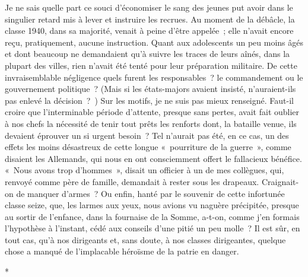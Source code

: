 \documentclass[french,twoside]{book} %
\begin{document}
Je ne sais quelle part ce souci d’économiser le sang des jeunes put avoir dans le singulier retard mis à lever et instruire les recrues. Au moment de la débâcle, la classe 1940, dans sa majorité, venait à peine d’être appelée ; elle n’avait encore reçu, pratiquement, aucune instruction. Quant aux adolescents un peu moins âgés et dont beaucoup ne demandaient qu’à suivre les traces de leurs aînés, dans la plupart des villes, rien n’avait été tenté pour leur préparation militaire. De cette invraisemblable négligence quels furent les responsables ? le   commandement ou le gouvernement politique ? (Mais si les états-majors avaient insisté, n’auraient-ils pas enlevé la décision ? ) Sur les motifs, je ne suis pas mieux renseigné. Faut-il croire que l’interminable période d’attente, presque sans pertes, avait fait oublier à nos chefs la nécessité de tenir tout prêts les renforts dont, la bataille venue, ils devaient éprouver un si urgent besoin ? Tel n’aurait pas été, en ce cas, un des effets les moins désastreux de cette longue « pourriture de la guerre », comme disaient les Allemands, qui nous en ont consciemment offert le fallacieux bénéfice. « Nous avons trop d’hommes », disait un officier à un de mes collègues, qui, renvoyé comme père de famille, demandait à rester sous les drapeaux. Craignait-on de manquer d’armes ? Ou enfin, hanté par le souvenir de cette infortunée classe seize, que, les larmes aux yeux, nous avions vu naguère précipitée, presque au sortir de l’enfance, dans la fournaise de la Somme, a-t-on, comme j’en formais l’hypothèse à l’instant, cédé aux conseils d’une pitié un peu molle ? Il est sûr, en tout cas, qu’à nos dirigeants et, sans doute, à nos classes dirigeantes, quelque chose a manqué de l’implacable héroïsme de la patrie en danger.\par

\begin{center}
*\par
\end{center}
\end{document}
